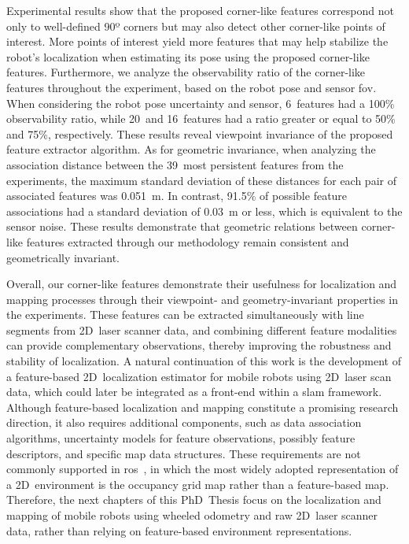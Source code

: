 Experimental results show that the proposed corner-like features correspond
not only to well-defined 90º corners but may also detect
other corner-like points of interest.
More points of interest yield more features that may help stabilize
the robot's localization when estimating its pose using
the proposed corner-like features.
Furthermore, we analyze the observability ratio of the corner-like features
throughout the experiment, based on the robot pose and sensor \gls{fov}.
When considering the robot pose uncertainty and sensor, 6~features had a 100\%
observability ratio, while 20~and 16~features had a ratio greater or equal
to 50\% and 75\%, respectively. These results reveal viewpoint invariance
of the proposed feature extractor algorithm. As for geometric invariance,
when analyzing the association distance between the 39~most persistent
features from the experiments, the maximum standard deviation of
these distances for each pair of associated features was 0.051~m.
In contrast, 91.5\% of possible feature associations had a standard deviation
of 0.03~m or less, which is equivalent to the sensor noise.
These results demonstrate that geometric relations between
corner-like features extracted through our methodology
remain consistent and geometrically invariant.

Overall, our corner-like features demonstrate their usefulness
for localization and mapping processes through their viewpoint- and
geometry-invariant properties in the experiments.
These features can be extracted simultaneously with line segments
from 2D~laser scanner data, and combining different feature modalities
can provide complementary observations, thereby improving
the robustness and stability of localization.
A natural continuation of this work is the development of
a feature-based 2D~localization estimator for mobile robots
using 2D~laser scan data, which could later be integrated
as a front-end within a \gls{slam} framework.
Although feature-based localization and mapping
constitute a promising research direction,
it also requires additional components, such as data association algorithms,
uncertainty models for feature observations,
possibly feature descriptors, and specific map data structures.
These requirements are not commonly supported in \gls{ros}~\cite{ros},
in which the most widely adopted representation of a 2D~environment is
the occupancy grid map rather than a feature-based map.
Therefore, the next chapters of this PhD~Thesis focus on
the localization and mapping of mobile robots using wheeled odometry and
raw 2D~laser scanner data, rather than relying on
feature-based environment representations.
